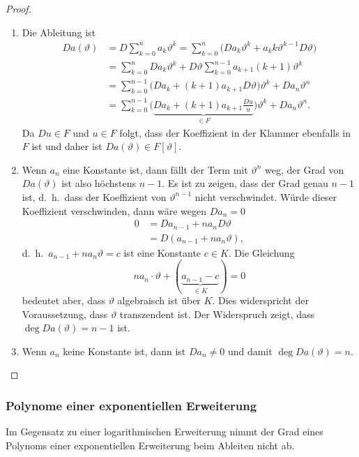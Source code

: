 \begin{proof}
\begin{enumerate}
\item
Die Ableitung ist
\begin{align*}
Da(\vartheta)
&=
D\sum_{k=0}^n a_k\vartheta^k
=
\sum_{k=0}^n \bigl(Da_k\vartheta^k + a_kk\vartheta^{k-1}D\vartheta\bigr)
\\
&=
\sum_{k=0}^n Da_k\vartheta^k
+
D\vartheta \sum_{k=0}^{n-1} a_{k+1}(k+1)\vartheta^k
\\
&=
\sum_{k=0}^{n-1} \bigl(Da_k+(k+1)a_{k+1}D\vartheta\bigr) \vartheta^k
+
Da_n \vartheta^n
\\
&=
\sum_{k=0}^{n-1}
\biggl(
\underbrace{Da_k+(k+1)a_{k+1}\frac{Du}{u}}_{\displaystyle\in F}
\biggr) \vartheta^k
+
Da_n \vartheta^n.
\end{align*}
Da $Du\in F$ und $u\in F$ folgt, dass der Koeffizient in der Klammer
ebenfalls in $F$ ist und daher ist $Da(\vartheta)\in F[\vartheta]$.
\item
Wenn $a_n$ eine Konstante ist, dann fällt der Term mit $\vartheta^n$ weg,
der Grad von $Da(\vartheta)$ ist also höchstens $n-1$.
Es ist zu zeigen, dass der Grad genau $n-1$ ist, d.~h.~dass der Koeffizient
von $\vartheta^{n-1}$ nicht verschwindet.
Würde dieser Koeffizient verschwinden, dann wäre wegen $Da_n=0$
\begin{align*}
0
&=
Da_{n-1} + na_n D\vartheta
\\
&=
D(a_{n-1}+na_n\vartheta),
\end{align*}
d.~h.~$a_{n-1}+na_n\vartheta=c$ ist eine Konstante $c\in K$.
Die Gleichung
\[
na_n\cdot\vartheta
+
(\underbrace{a_{n-1}-c}_{\displaystyle\in K})
=
0
\]
bedeutet aber, dass $\vartheta$ algebraisch ist über $K$.
Dies widerspricht der Voraussetzung, dass $\vartheta$ transzendent ist.
Der Widerspruch zeigt, dass $\deg Da(\vartheta)=n-1$ ist.
\item
Wenn $a_n$ keine Konstante ist, dann ist $Da_n\ne 0$ und damit
$\deg Da(\vartheta)=n$.
\qedhere
\end{enumerate}
\end{proof}

%
%
\subsubsection{Polynome einer exponentiellen Erweiterung}
Im Gegensatz zu einer logarithmischen Erweiterung nimmt der Grad
eines Polynoms einer exponentiellen Erweiterung beim Ableiten nicht ab.

